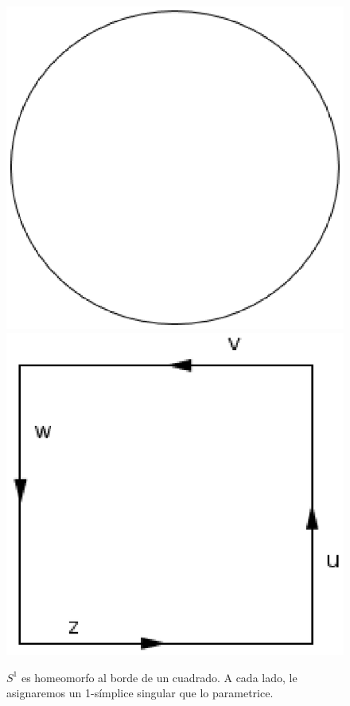 \begin{figure}[h]
\centering
\includegraphics[scale=0.6]{Figures/HomoCWlindro1}
 \includegraphics[scale=0.8]{Figures/HomoCWlindro2}
\caption{\label{FigCWlindro1}$S^1$ es homeomorfo al borde de un cuadrado. A cada lado, le asignaremos un 1-símplice singular que lo parametrice.}
\end{figure}

